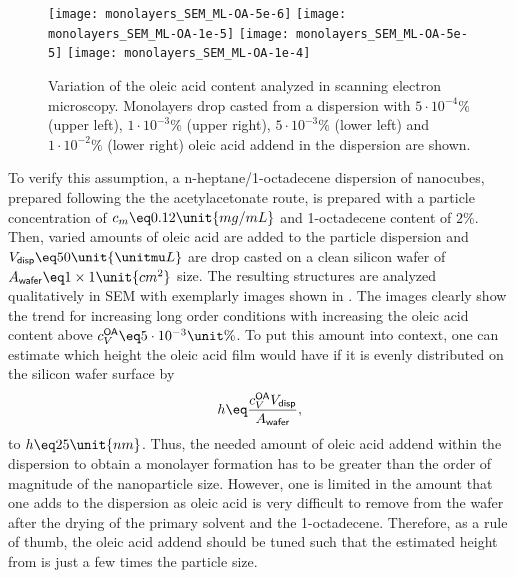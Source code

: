 \documentclass[\main/dresen_thesis.tex]{subfiles}
\begin{document}
  \begin{figure}[tb]
    \centering
    \texttt{[image: monolayers\_SEM\_ML-OA-5e-6]}
    \texttt{[image: monolayers\_SEM\_ML-OA-1e-5]}
    \texttt{[image: monolayers\_SEM\_ML-OA-5e-5]}
    \texttt{[image: monolayers\_SEM\_ML-OA-1e-4]}
    \caption{\label{fig:monolayers:preparation:solventVariation:OAAddend}Variation of the oleic acid content analyzed in scanning electron microscopy. Monolayers drop casted from a dispersion with $5\cdot10^{-4} \unit{\%}$ (upper left), $1\cdot10^{-3} \unit{\%}$ (upper right), $5\cdot10^{-3} \unit{\%}$ (lower left) and $1\cdot10^{-2} \unit{\%}$ (lower right) oleic acid addend in the dispersion are shown.}
  \end{figure}

  To verify this assumption, a n-heptane/1-octadecene dispersion of nanocubes, prepared following the the acetylacetonate route, is prepared with a particle concentration of $c_m \eq 0.12 \unit{mg/mL}$ and 1-octadecene content of $2\unit{\%}$.
  Then, varied amounts of oleic acid are added to the particle dispersion and $V_\textsf{disp} \eq 50 \unit{\unitmu L}$ are drop casted on a clean silicon wafer of $ A_\textsf{wafer} \eq 1 \times 1 \unit{cm^2}$ size.
  The resulting structures are analyzed qualitatively in SEM with exemplarly images shown in .
  The images clearly show the trend for increasing long order conditions with increasing the oleic acid content above $c_V^\textsf{OA} \eq 5\cdot10^{-3} \unit{\%}$.
  To put this amount into context, one can estimate which height the oleic acid film would have if it is evenly distributed on the silicon wafer surface by
  \begin{align}
    h \eq \frac{c_V^\textsf{OA} V_\textsf{disp}}{A_\textsf{wafer}}, \label{eq:monolayers:preparation:solventVariation:OAAddend}
  \end{align}
  to $h \eq 25 \unit{nm}$.
  Thus, the needed amount of oleic acid addend within the dispersion to obtain a monolayer formation has to be greater than the order of magnitude of the nanoparticle size.
  However, one is limited in the amount that one adds to the dispersion as oleic acid is very difficult to remove from the wafer after the drying of the primary solvent and the 1-octadecene.
  Therefore, as a rule of thumb, the oleic acid addend should be tuned such that the estimated height from  is just a few times the particle size.
\end{document}
